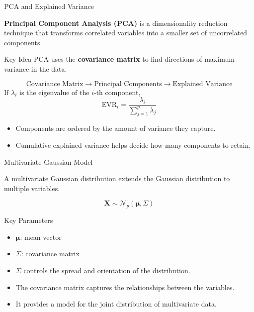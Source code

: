 \documentclass{beamer}
\begin{document}

\begin{frame}{PCA and Explained Variance}

\textbf{Principal Component Analysis (PCA)} is a dimensionality
reduction technique that transforms correlated variables into
a smaller set of uncorrelated components.

\begin{block}{Key Idea}
PCA uses the \textbf{covariance matrix} to find directions
of maximum variance in the data.
\end{block}
\[
\boxed{
\text{Covariance Matrix}
\longrightarrow
\text{Principal Components}
\longrightarrow
\text{Explained Variance}
}
\]
If $\lambda_i$ is the eigenvalue of the $i$-th component,
\[
\boxed{
\text{EVR}_i
=
\frac{\lambda_i}{\sum_{j=1}^{p}\lambda_j}
}
\]

\begin{itemize}
    \item Components are ordered by the amount of variance they capture.
    \item Cumulative explained variance helps decide how many components to retain.
\end{itemize}

\end{frame}


\begin{frame}{Multivariate Gaussian Model}

A multivariate Gaussian distribution extends the Gaussian
distribution to multiple variables.

\[
\boxed{
\mathbf{X}\sim\mathcal{N}_p(\boldsymbol{\mu},\Sigma)
}
\]

\begin{block}{Key Parameters}
\begin{itemize}
    \item $\boldsymbol{\mu}$: mean vector
    \item $\Sigma$: covariance matrix
    \item $\Sigma$ controls the spread and orientation of the distribution.
\end{itemize}
\end{block}

\begin{itemize}
    \item The covariance matrix captures the relationships between
          the variables.
    \item It provides a model for the joint distribution of multivariate data.
\end{itemize}

\end{frame}
\end{document}
